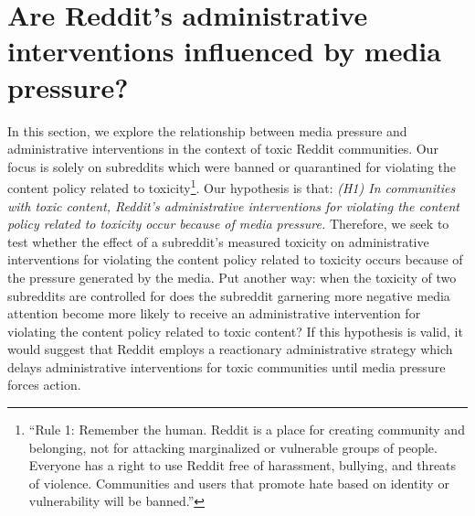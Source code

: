 \section{Are Reddit's administrative interventions influenced by media
pressure?} \label{sec:relationship}
%
 In this section, we explore the relationship between media
pressure and administrative interventions in the context of toxic Reddit
communities. Our focus is solely on subreddits which were banned or quarantined for violating
the content policy related to toxicity\footnote{``Rule 1: Remember the human.
Reddit is a place for creating community and belonging, not for attacking
marginalized or vulnerable groups of people. Everyone has a right to use
Reddit free of harassment, bullying, and threats of violence. Communities and
users that promote hate based on identity or vulnerability will be banned.''}.
Our hypothesis is that: \emph{(H1) In communities with toxic content, Reddit's
administrative interventions for violating the content policy related to
toxicity occur because of media pressure.} Therefore, we
seek to test whether the effect of a subreddit's measured toxicity on
administrative interventions for violating the content policy related to
toxicity occurs because of the pressure generated by the media. Put
another way: when the toxicity of two subreddits are controlled for does the
subreddit garnering more negative media attention become more likely to
receive an administrative intervention for violating the content policy related
to toxic content? If this hypothesis is valid, it would suggest that Reddit
employs a reactionary administrative strategy which delays administrative
interventions for toxic communities until media pressure forces action. 

